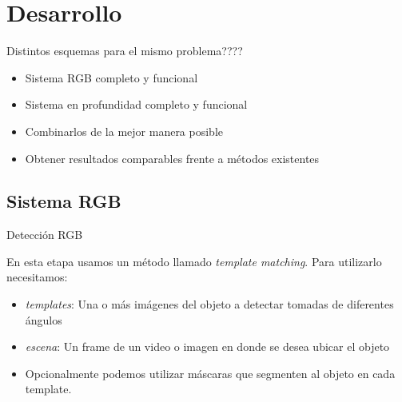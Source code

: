 \documentclass[]{beamer}
\begin{document}
\section{Desarrollo}
\begin{frame}{Distintos esquemas para el mismo problema????}

    \begin{itemize}
        \item Sistema RGB completo y funcional
        \item Sistema en profundidad completo y funcional
        \item Combinarlos de la mejor manera posible
        \item Obtener resultados comparables frente a métodos existentes
    \end{itemize}

\end{frame}

\subsection{Sistema RGB}
\begin{frame}[t]{Detección RGB}

    En esta etapa usamos un método llamado \textit{template matching}. Para utilizarlo necesitamos:
    \begin{itemize}
        \item \textit{templates}: Una o más imágenes del objeto a detectar tomadas de diferentes ángulos
        \item \textit{escena}: Un frame de un video o imagen en donde se desea ubicar el objeto
        \item Opcionalmente podemos utilizar máscaras que segmenten al objeto en cada template.
    \end{itemize}
\end{frame}
\end{document}
